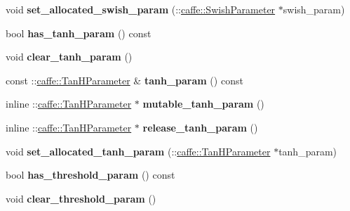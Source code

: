 \begin{DoxyCompactItemize}
void {\bfseries set\+\_\+allocated\+\_\+swish\+\_\+param} (\+::\mbox{\hyperlink{classcaffe_1_1_swish_parameter}{caffe\+::\+Swish\+Parameter}} $\ast$swish\+\_\+param)
\item 
\mbox{\label{classcaffe_1_1_layer_parameter_a0cd70a95e1ba4c3ffc1b5d4dfd9b81a2}} 
bool {\bfseries has\+\_\+tanh\+\_\+param} () const
\item 
\mbox{\label{classcaffe_1_1_layer_parameter_aebc4bc59174bced491799e7d432bcd6f}} 
void {\bfseries clear\+\_\+tanh\+\_\+param} ()
\item 
\mbox{\label{classcaffe_1_1_layer_parameter_a20ec5f4cab442e771ebc3982d4362761}} 
const \+::\mbox{\hyperlink{classcaffe_1_1_tan_h_parameter}{caffe\+::\+Tan\+H\+Parameter}} \& {\bfseries tanh\+\_\+param} () const
\item 
\mbox{\label{classcaffe_1_1_layer_parameter_a8c1de4416cb843f404b3ad93740a7ab8}} 
inline \+::\mbox{\hyperlink{classcaffe_1_1_tan_h_parameter}{caffe\+::\+Tan\+H\+Parameter}} $\ast$ {\bfseries mutable\+\_\+tanh\+\_\+param} ()
\item 
\mbox{\label{classcaffe_1_1_layer_parameter_a614efa32ef9e4eb74d0e85de01ca3b88}} 
inline \+::\mbox{\hyperlink{classcaffe_1_1_tan_h_parameter}{caffe\+::\+Tan\+H\+Parameter}} $\ast$ {\bfseries release\+\_\+tanh\+\_\+param} ()
\item 
\mbox{\label{classcaffe_1_1_layer_parameter_ab97aefd60b8082725bfbce0fcfd5d27c}} 
void {\bfseries set\+\_\+allocated\+\_\+tanh\+\_\+param} (\+::\mbox{\hyperlink{classcaffe_1_1_tan_h_parameter}{caffe\+::\+Tan\+H\+Parameter}} $\ast$tanh\+\_\+param)
\item 
\mbox{\label{classcaffe_1_1_layer_parameter_aa6aac9ad37e2ed789f0be9ac156dd2b4}} 
bool {\bfseries has\+\_\+threshold\+\_\+param} () const
\item 
\mbox{\label{classcaffe_1_1_layer_parameter_a8f14e88722f9621be440fd150614af23}} 
void {\bfseries clear\+\_\+threshold\+\_\+param} ()
\item 

\end{DoxyCompactItemize}
